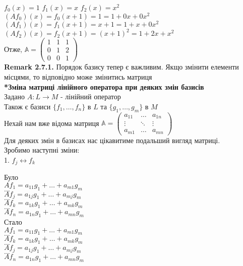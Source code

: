 \documentclass[a4paper, 14pt]{extarticle}
\def\bigline{\vspace{5mm}\\}
\begin{document}
	$f_0(x) = 1$ \hspace{0.5cm} $f_1(x) = x$ \hspace{0.5cm} $f_2(x) = x^2$\\
	$(Af_0)(x) = f_0(x+1) = 1 = 1 + 0x + 0x^2$\\
	$(Af_1)(x) = f_1(x+1) = x+1 = 1 + x + 0x^2$\\
	$(Af_2)(x) = f_2(x+1) = (x+1)^2 = 1 + 2x + x^2$\\
	Отже, $\mathbb{A} = \begin{pmatrix}
	1 & 1 & 1 \\
	0 & 1 & 2 \\
	0 & 0 & 1 
	\end{pmatrix}$
	\bigline
	\textbf{Remark 2.7.1.} Порядок базису тепер є важливим. Якщо змінити елементи місцями, то відповідно може змінитись матриця
	\bigline
	\textbf{*Зміна матриці лінійного оператора при деяких змін базисів}\\
	Задано $A: L \to M$ - лінійний оператор \\ Також є базиси $\{f_1,\dots,f_n\}$ в $L$ та $\{g_1,\dots,g_m\}$ в $M$\\
	Нехай нам вже відома матриця $\mathbb{A} = \begin{pmatrix}
	a_{11} & \dots & a_{1n} \\
	\vdots & \ddots & \vdots \\
	a_{m1} & \dots & a_{mn}
	\end{pmatrix}$\\
	Для деяких змін в базисах нас цікавитиме подальший вигляд матриці.\\
	Зробимо наступні зміни:
	\bigline
	1. $f_j \longleftrightarrow f_k$
\multicolsep=0pt
	\begin{multicols}{2}
	Було \\
$Af_1 = a_{11}g_1 + \dots + a_{m1}g_m$ \\
$\dots$ \\
$Af_j = a_{1j}g_1 + \dots + a_{mj}g_m$ \\
$\dots$ \\
$Af_k = a_{1k}g_1 + \dots + a_{mk}g_m$ \\
$\dots$ \\
$Af_n = a_{1n}g_1 + \dots + a_{mn}g_m$
	\columnbreak
	\\
	Стало \\
$Af_1 = a_{11}g_1 + \dots + a_{m1}g_m$ \\
$\dots$ \\
$Af_k = a_{1k}g_1 + \dots + a_{mk}g_m$\\
$\dots$ \\
$Af_j = a_{1j}g_1 + \dots + a_{mj}g_m$\\
$\dots$ \\
$Af_n = a_{1n}g_1 + \dots + a_{mn}g_m$
	\end{multicols}
\end{document}
